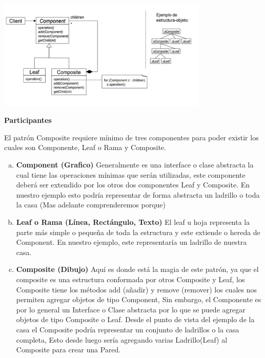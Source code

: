 \begin{flushleft}
\textbf{}\\ 
\textbf{}\\ 

\begin{center}
	\includegraphics[width=10cm]{./Imagenes/composite2} 
	\end{center}

\textbf{Participantes}

El patrón Composite requiere mínimo de tres componentes para poder existir los cuales son Componente, Leaf o Rama y Composite.

\begin{enumerate}[a)]
        \item \textbf{ Component (Grafico)}
Generalmente es una interface o clase abstracta la cual tiene las operaciones mínimas que serán utilizadas, este componente deberá ser extendido por los otros dos componentes Leaf y Composite. En nuestro ejemplo esto podría representar de forma abstracta un ladrillo o toda la casa (Mas adelante comprenderemos porque)

        \item \textbf{ Leaf o Rama (Línea, Rectángulo, Texto)}
El leaf u hoja representa la parte más simple o pequeña de toda la estructura y este extiende o hereda de Component. En nuestro ejemplo, este representaría un ladrillo de nuestra casa.

	\item \textbf{Composite (Dibujo)}
Aquí es donde está la magia de este patrón, ya que el composite es una estructura conformada por otros Composite y Leaf, los Composite tiene los métodos add  (añadir) y remove (remover) los cuales nos permiten agregar objetos de tipo Component, Sin embargo, el Componente es por lo general un Interface o Clase abstracta  por lo que se puede agregar objetos de tipo Composite o Leaf.   Desde el punto de vista del ejemplo de la casa el Composite podría representar un conjunto de ladrillos o la casa completa, Esto desde luego sería agregando varias Ladrillo(Leaf) al Composite para crear una Pared.


\end{enumerate}
\end{flushleft}
